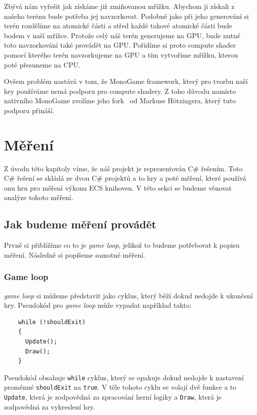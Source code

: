 Zbývá nám vyřešit jak získáme již zmiňovanou mřížku. Abychom ji získali z našeho terénu bude potřeba jej navzorkovat. Podobně jako při jeho generování si terén rozdělíme na atomické části a střed každé takové atomické části bude bodem v naší mřížce. Protože celý náš terén generujeme na GPU, bude nutné toto navzorkování také provádět na GPU. Pořídíme si proto compute shader pomocí kterého terén navzorkujeme na GPU a tím vytvoříme mřížku, kterou poté přesuneme na CPU.

Ovšem problém nastává v tom, že MonoGame framework, který pro tvorbu naší hry používáme nemá podporu pro compute shadery. Z toho důvodu namísto nativního MonoGame zvolíme jeho fork~\cite{MonoGameCptMax} od Markuse Hötzingera, který tuto podporu přináší.

\section{Měření}
\label{benchmark-analysis}
Z úvodu této kapitoly víme, že náš projekt je reprezentován C\# řešením. Toto C\# řešení se skládá ze dvou C\# projektů a to hry a poté měření, které používá onu hru pro měření výkonu ECS knihoven. V této sekci se budeme věnovat analýze tohoto měření.

\subsection{Jak budeme měření provádět}
Prvně si přiblížíme co to je \textit{game loop}, jelikož to budeme potřebovat k popisu měření. Následně si popíšeme samotné měření.

\subsubsection{Game loop}
\label{game-loop}
\textit{game loop} si můžeme představit jako cyklus, který běží dokud nedojde k ukončení hry. Pseudokód pro \textit{game loop} může vypadat například takto:

\begin{verbatim}
    while (!shouldExit) 
    {
      Update();
      Draw();
    }
\end{verbatim}

Pseudokód obsahuje \texttt{while} cyklus, který se opakuje dokud nedojde k nastavení proměnné \texttt{shouldExit} na \texttt{true}. V těle tohoto cyklu se volají dvě funkce a to \texttt{Update}, která je zodpovědná za zpracování herní logiky a \texttt{Draw}, která je zodpovědná za vykreslení hry. 

